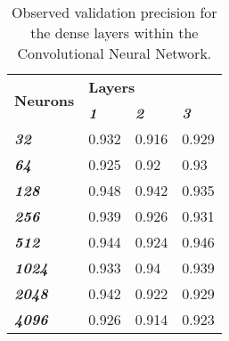 \documentclass{article}
\begin{document}
\begin{table}[] \footnotesize
\centering
\caption{Observed validation precision for the dense layers within the Convolutional Neural Network.}
\label{tab:dense-precision}
\begin{tabular}{@{}llll@{}}
\toprule
\multirow{2}{*}{\textbf{Neurons}} & \multicolumn{3}{l}{\textbf{Layers}}                             \\ \cmidrule(l){2-4} 
                                  & \textit{\textbf{1}} & \textit{\textbf{2}} & \textit{\textbf{3}} \\ \cmidrule(r){1-1}
\textit{\textbf{32}}              & 0.932               & 0.916               & 0.929               \\
\textit{\textbf{64}}              & 0.925               & 0.92                & 0.93                \\
\textit{\textbf{128}}             & 0.948               & 0.942               & 0.935               \\
\textit{\textbf{256}}             & 0.939               & 0.926               & 0.931               \\
\textit{\textbf{512}}             & 0.944               & 0.924               & 0.946               \\
\textit{\textbf{1024}}            & 0.933               & 0.94                & 0.939               \\
\textit{\textbf{2048}}            & 0.942               & 0.922               & 0.929               \\
\textit{\textbf{4096}}            & 0.926               & 0.914               & 0.923               \\ \bottomrule
\end{tabular}
\end{table}
\end{document}
